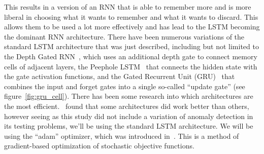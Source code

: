 This results in a version of an RNN that is able to remember more and is more liberal in choosing what it wants to remember and what it wants to discard. This allows them to be used a lot more effectively and has lead to the LSTM becoming the dominant RNN architecture. There have been numerous variations of the standard LSTM architecture that was just described, including but not limited to the Depth Gated RNN~\cite{yao2015depth}, which uses an additional depth gate to connect memory cells of adjacent layers, the Peephole LSTM~\cite{gers2002learning} that connects the hidden state with the gate activation functions, and the Gated Recurrent Unit (GRU)~\cite{cho2014learning} that combines the input and forget gates into a single so-called \enquote{update gate} (see figure~\ref{fig:gru_cell}). There has been some research into which architectures are the most efficient.~\cite{jozefowicz2015empirical} found that some architectures did work better than others, however seeing as this study did not include a variation of anomaly detection in its testing problems, we'll be using the standard LSTM architecture. We will be using the \enquote{adam} optimizer, which was introduced in~\cite{kingma2014adam}. This is a method of gradient-based optimization of stochastic objective functions.